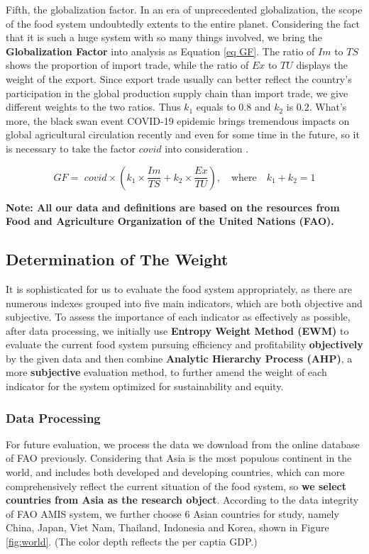 \documentclass{mcmthesis}
\begin{document}
Fifth, the globalization factor. In an era of unprecedented globalization, the scope of the food system undoubtedly extents to the entire planet. Considering the fact that it is such a huge system with so many things involved, we bring the \textbf{Globalization Factor} into analysis as Equation \eqref{eq GF}. The ratio of $Im$ to $TS$ shows the proportion of import trade, while the ratio of $Ex$ to $TU$ displays the weight of the export. Since export trade usually can better reflect the country's participation in the global production supply chain than import trade, we give different weights to the two ratios. Thus $k_1$ equals to $0.8$ and $k_2$ is $0.2$. What's more, the black swan event COVID-19 epidemic brings tremendous impacts on global agricultural circulation recently and even for some time in the future, so it is necessary to take the factor $covid$ into consideration \cite{covid}. 

\begin{equation}
\label{eq GF}
GF=\,\, covid \times (k_1\times \frac{Im}{TS}+k_2\times \frac{Ex}{TU}),
\quad \text{where} \quad k_1+k_2=1
\end{equation}

\textbf{Note: All our data and definitions are based on the resources from Food and Agriculture Organization of the United Nations (FAO).}

\subsection{Determination of The Weight}
\label{Sec-weight}
It is sophisticated for us to evaluate the food system appropriately, as there are numerous indexes grouped into five main indicators, which are both objective and subjective. To assess the importance of each indicator as effectively as possible, after data processing, we initially use \textbf{Entropy Weight Method (EWM)} to evaluate the current food system pursuing efficiency and profitability \textbf{objectively} by the given data and then combine \textbf{Analytic Hierarchy Process (AHP)}, a more \textbf{subjective} evaluation method, to further amend the weight of each indicator for the system optimized for sustainability and equity.

\subsubsection{Data Processing}
For future evaluation, we process the data we download from the online database of FAO previously. Considering that Asia is the most populous continent in the world, and includes both developed and developing countries, which can more comprehensively reflect the current situation of the food system, so \textbf{we select countries from Asia as the research object}. According to the data integrity of FAO AMIS system, we further choose 6 Asian countries for study, namely China, Japan, Viet Nam, Thailand, Indonesia and Korea, shown in Figure \ref{fig:world}. (The color depth reflects the per captia GDP.)
\end{document}
